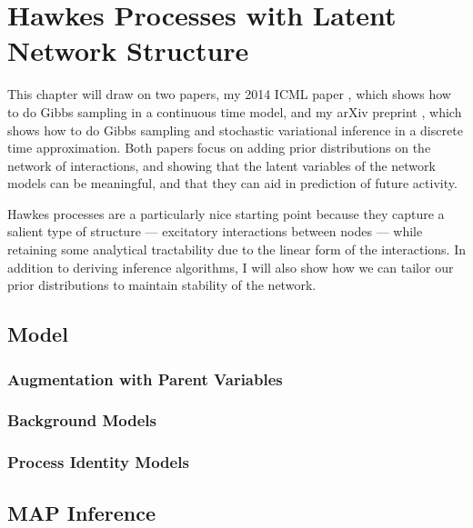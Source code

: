 
\chapter{Hawkes Processes with Latent Network Structure}

This chapter will draw on two papers, my 2014 ICML paper \cite{linderman2014discovering}, 
which shows how to do Gibbs sampling in a continuous time model,
and my arXiv preprint \cite{linderman2015scalable}, which shows 
how to do Gibbs sampling and stochastic variational inference in 
a discrete time approximation.  Both papers focus on
adding prior distributions on the network of interactions, and 
showing that the latent variables of the network models can be 
meaningful, and that they can aid in prediction of future 
activity. 

Hawkes processes are a particularly nice starting point 
because they capture a salient type of structure --- excitatory 
interactions between nodes --- while retaining some 
analytical tractability due to the linear form of the 
interactions. In addition to deriving inference algorithms, I 
will also show how we can tailor our prior distributions to 
maintain stability of the network. 

\section{Model}

\subsection{Augmentation with Parent Variables}

\subsection{Background Models}

\subsection{Process Identity Models}

\section{MAP Inference}

